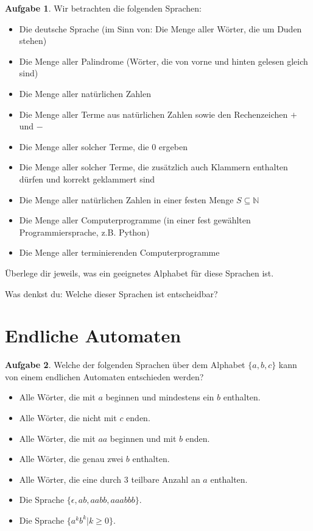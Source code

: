 \documentclass[a4paper,ngerman,12pt]{scrartcl}
\newcommand{\IN}{\mathbb{N}}
\theoremstyle{definition}
\newtheorem{aufg}{Aufgabe}
\theoremstyle{plain}
\theoremstyle{remark}
\begin{document}
\begin{aufg}
	Wir betrachten die folgenden Sprachen:
	\begin{itemize}
		\item Die deutsche Sprache (im Sinn von: Die Menge aller Wörter, die um Duden stehen)
		\item Die Menge aller Palindrome (Wörter, die von vorne und hinten gelesen gleich sind)
		\item Die Menge aller natürlichen Zahlen
		\item Die Menge aller Terme aus natürlichen Zahlen sowie den Rechenzeichen $+$ und $-$
		\item Die Menge aller solcher Terme, die $0$ ergeben
		\item Die Menge aller solcher Terme, die zusätzlich auch Klammern enthalten dürfen und korrekt geklammert sind
		\item Die Menge aller natürlichen Zahlen in einer festen Menge $S \subseteq \IN$
		\item Die Menge aller Computerprogramme (in einer fest gewählten Programmiersprache, z.B. Python)
		\item Die Menge aller terminierenden Computerprogramme
	\end{itemize}
	Überlege dir jeweils, was ein geeignetes Alphabet für diese Sprachen ist.
	
	Was denkst du: Welche dieser Sprachen ist entscheidbar?
\end{aufg}

\section{Endliche Automaten}

\begin{aufg}
	Welche der folgenden Sprachen über dem Alphabet $\{a,b,c\}$ kann von einem endlichen Automaten entschieden werden?
	\begin{itemize}
		\item Alle Wörter, die mit $a$ beginnen und mindestens ein $b$ enthalten.
		\item Alle Wörter, die nicht mit $c$ enden.
		\item Alle Wörter, die mit $aa$ beginnen und mit $b$ enden.
		\item Alle Wörter, die genau zwei $b$ enthalten.
		\item Alle Wörter, die eine durch $3$ teilbare Anzahl an $a$ enthalten.
		\item Die Sprache $\{\epsilon,ab,aabb,aaabbb\}$.
		\item Die Sprache $\{a^kb^k | k \geq 0\}$.
	\end{itemize}
\end{aufg}
\end{document}
